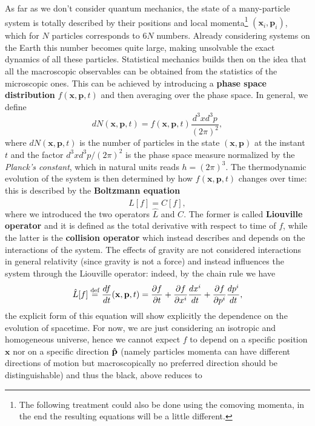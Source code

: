 As far as we don't consider quantum mechanics, the state of a many-particle system is totally described by their positions and local momenta\footnote{The following treatment could also be done using the comoving momenta, in the end the resulting equations will be a little different.} $(\mathbf x_i,\mathbf p_i)$, which for $N$ particles corresponds to $6N$ numbers. Already considering systems on the Earth this number becomes quite large, making unsolvable the exact dynamics of all these particles. Statistical mechanics builds then on the idea that all the macroscopic observables can be obtained from the statistics of the microscopic ones. This can be achieved by introducing a \textbf{phase space distribution} $f(\mathbf x,\mathbf p, t)$ and then averaging over the phase space. In general, we define
\begin{equation}
    \label{eq:phspace_dist}
    dN(\mathbf x,\mathbf p, t)=f(\mathbf x,\mathbf p, t) \frac{d^3xd^3p}{(2\pi)^2},
\end{equation}
where $dN(\mathbf x,\mathbf p, t)$ is the number of particles in the state $(\mathbf x,\mathbf p)$ at the instant $t$ and the factor $d^3xd^3p/(2\pi)^2$ is the phase space measure normalized by the \emph{Planck's constant}, which in natural units reads $h=(2\pi)^{3}$. The thermodynamic evolution of the system is then determined by how $f(\mathbf x,\mathbf p, t)$ changes over time: this is described by the \textbf{Boltzmann equation}
\begin{equation}
    \label{eq:Boltzmann}
    \hat{L}[f]=C[f],
\end{equation}
where we introduced the two operators $\hat{L}$ and $C$. The former is called \textbf{Liouville operator} and it is defined as the total derivative with respect to time of $f$, while the latter is the \textbf{collision operator} which instead describes and depends on the interactions of the system. The effects of gravity are not considered interactions in general relativity (since gravity is not a force) and instead influences the system through the Liouville operator: indeed, by the chain rule we have 
$$ 
\hat{L}[f]\stackrel{\text{def}}{=}\frac{df}{dt}(\mathbf x,\mathbf p, t)= \frac{\partial f}{\partial t}+\frac{\partial f}{\partial x^i}\frac{dx^i}{dt}+\frac{\partial f}{\partial p^i}\frac{dp^i}{dt},
$$ 
the explicit form of this equation will show explicitly the dependence on the evolution of spacetime. For now, we are just considering an isotropic and homogeneous universe, hence we cannot expect $f$ to depend on a specific position $\mathbf{x}$ nor on a specific direction $\mathbf{\hat{p}}$ (namely particles momenta can have different directions of motion but macroscopically no preferred direction should be distinguishable) and thus the black, above reduces to 
